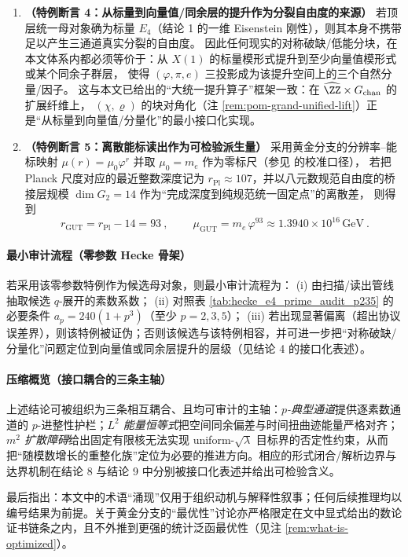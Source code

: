\begin{enumerate}
  \item \textbf{（特例断言 4：从标量到向量值/同余层的提升作为分裂自由度的来源）}
  若顶层统一母对象确为标量 \(E_4\)（结论 1 的一维 Eisenstein 刚性），则其本身不携带足以产生三通道真实分裂的自由度。
  因此任何现实的对称破缺/低能分块，在本文体系内都必须等价于：从 \(X(1)\) 的标量模形式提升到至少向量值模形式或某个同余子群层，
  使得 \((\varphi,\pi,e)\) 三投影成为该提升空间上的三个自然分量/因子。
  这与本文已给出的“大统一提升算子”框架一致：在 \(\widehat{\ZZ}\times G_{\mathrm{chan}}\) 的扩展纤维上，
  \((\chi,\varrho)\) 的块对角化（注 \ref{rem:pom-grand-unified-lift}）正是“从标量到向量值/分量化”的最小接口化实现。

  \item \textbf{（特例断言 5：离散能标读出作为可检验派生量）}
  采用黄金分支的分辨率--能标映射 \(\mu(r)=\mu_0\varphi^{r}\) 并取 \(\mu_0=m_e\) 作为零标尺（参见 \cite{Internal2025PhysicalConstantsGeometry} 的校准口径），
  若把 Planck 尺度对应的最近整数深度记为 \(r_{\mathrm{Pl}}\approx 107\)，并以八元数规范自由度的桥接层规模 \(\dim G_2=14\) 作为“完成深度到纯规范统一固定点”的离散差，
  则得到
  \[
  \boxed{\ r_{\mathrm{GUT}}=r_{\mathrm{Pl}}-14=93\ },
  \qquad
  \boxed{\ \mu_{\mathrm{GUT}}=m_e\,\varphi^{93}\approx 1.3940\times 10^{16}\,\mathrm{GeV}\ }.
  \]
\end{enumerate}

\paragraph{最小审计流程（零参数 Hecke 骨架）}
若采用该零参数特例作为候选母对象，则最小审计流程为：
(i) 由扫描/读出管线抽取候选 \(q\)-展开的素数系数；
(ii) 对照表 \ref{tab:hecke_e4_prime_audit_p235} 的必要条件 \(a_p=240(1+p^3)\)（至少 \(p=2,3,5\)）；
(iii) 若出现显著偏离（超出协议误差界），则该特例被证伪；否则该候选与该特例相容，并可进一步把“对称破缺/分量化”问题定位到向量值或同余层提升的层级（见结论 4 的接口化表述）。

\paragraph{压缩概览（接口耦合的三条主轴）}
上述结论可被组织为三条相互耦合、且均可审计的主轴：\emph{\(p\)-典型通道}提供逐素数通道的 \(p\)-进整性护栏；\emph{\(L^2\) 能量恒等式}把空间同余偏差与时间扭曲迹能量严格对齐；\emph{\(m^2\) 扩散障碍}给出固定有限核无法实现 uniform-\(\sqrt{\lambda}\) 目标界的否定性约束，从而把“随模数增长的重整化族”定位为必要的推进方向。相应的形式闭合/解析边界与达界机制在结论 8 与结论 9 中分别被接口化表述并给出可检验含义。

最后指出：本文中的术语“涌现”仅用于组织动机与解释性叙事；任何后续推理均以编号结果为前提。关于黄金分支的“最优性”讨论亦严格限定在文中显式给出的数论证书链条之内，且不外推到更强的统计泛函最优性（见注 \ref{rem:what-is-optimized}）。
